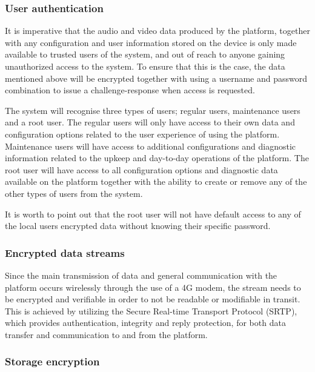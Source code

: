 \documentclass[10pt]{article}
\begin{document}
      \subsubsection{User authentication}

        It is imperative that the audio and video data produced by the
        platform, together with any configuration and user information stored
        on the device is only made available to trusted users of the system,
        and out of reach to anyone gaining unauthorized access to the system.
        To ensure that this is the case, the data mentioned above will be
        encrypted together with using a username and password combination to
        issue a challenge-response when access is requested.

        The system will recognise three types of users; regular users,
        maintenance users and a root user. The regular users will only have
        access to their own data and configuration options related to the user
        experience of using the platform. Maintenance users will have access to
        additional configurations and diagnostic information related to the
        upkeep and day-to-day operations of the platform. The root user will
        have access to all configuration options and diagnostic data  available
        on the platform together with the ability to create or remove any of
        the other types of users from the system.

        It is worth to point out that the root user will not have default
        access to any of the local users encrypted data without knowing their
        specific password.

      \subsubsection{Encrypted data streams}

        Since the main transmission of data and general communication with the
        platform occurs wirelessly through the use of a 4G modem, the stream
        needs to be encrypted and verifiable in order to not be readable or
        modifiable in transit. This is achieved by utilizing the Secure
        Real-time Transport Protocol (SRTP), which provides authentication,
        integrity and reply protection, for both data transfer and
        communication to and from the platform.

      \subsubsection{Storage encryption}
\end{document}
